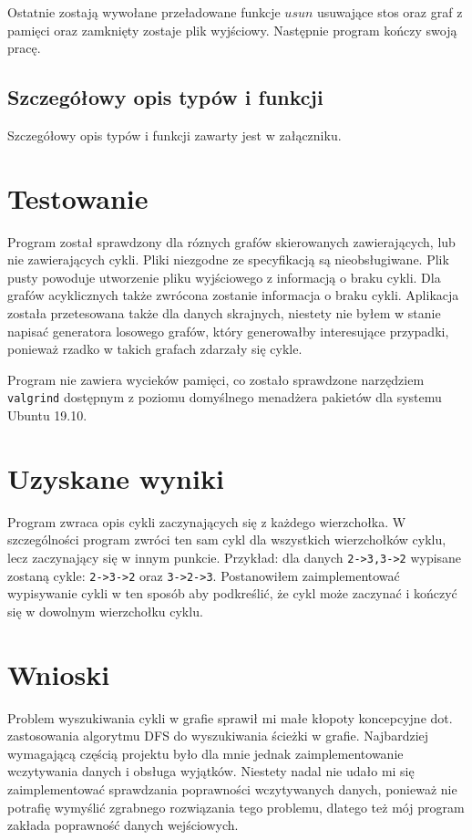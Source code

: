 \documentclass[12pt,a4paper]{article}
\begin{document}
Ostatnie zostają wywołane przeładowane funkcje $usun$ usuwające stos oraz graf z pamięci oraz zamknięty zostaje plik wyjściowy.
Następnie program kończy swoją pracę.

\subsection{Szczegółowy opis typów i funkcji}

Szczegółowy opis typów i funkcji zawarty jest w załączniku.

\section{Testowanie}
Program został sprawdzony dla róznych grafów skierowanych zawierających, lub nie zawierających cykli. Pliki niezgodne ze specyfikacją są nieobsługiwane. Plik pusty powoduje utworzenie pliku wyjściowego z informacją o braku cykli.
Dla grafów acyklicznych także zwrócona zostanie informacja o braku cykli. Aplikacja została przetesowana także dla danych skrajnych, niestety nie byłem w stanie napisać generatora losowego grafów, który
generowałby interesujące przypadki, ponieważ rzadko w takich grafach zdarzały się cykle.

Program nie zawiera wycieków pamięci, co zostało sprawdzone narzędziem \texttt{valgrind} dostępnym z poziomu domyślnego menadżera pakietów dla systemu Ubuntu 19.10.

\section{Uzyskane wyniki}
Program zwraca opis cykli zaczynających się z każdego wierzchołka. W szczególności program zwróci ten sam cykl dla wszystkich wierzchołków cyklu, lecz zaczynający się w innym punkcie. Przykład: dla
danych \texttt{2->3,3->2} wypisane zostaną cykle: \texttt{2->3->2} oraz \texttt{3->2->3}. Postanowiłem zaimplementować wypisywanie cykli w ten sposób aby podkreślić, że cykl może zaczynać i kończyć się
w dowolnym wierzchołku cyklu.
\section{Wnioski}
Problem wyszukiwania cykli w grafie sprawił mi małe kłopoty koncepcyjne dot. zastosowania algorytmu DFS do wyszukiwania ścieżki w grafie. Najbardziej wymagającą częścią projektu było dla mnie
jednak zaimplementowanie wczytywania danych i obsługa wyjątków. Niestety nadal nie udało mi się zaimplementować sprawdzania poprawności wczytywanych danych, ponieważ nie potrafię wymyślić zgrabnego
rozwiązania tego problemu, dlatego też mój program zakłada poprawność danych wejściowych.
\end{document}
